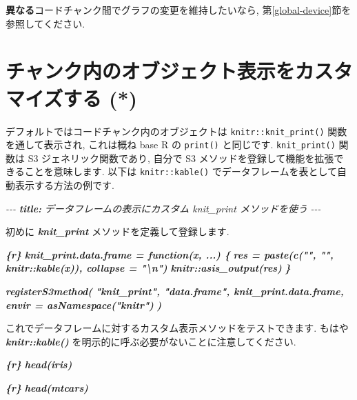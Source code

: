 \documentclass[
  11pt,
  lualatex,
  ja=standard]{bxjsreport}
\newenvironment{Shaded}{\begin{snugshade}}{\end{snugshade}}
\newcommand{\AnnotationTok}[1]{\textcolor[rgb]{0.56,0.35,0.01}{\textbf{\textit{#1}}}}
\newcommand{\CommentTok}[1]{\textcolor[rgb]{0.56,0.35,0.01}{\textit{#1}}}
\newcommand{\InformationTok}[1]{\textcolor[rgb]{0.56,0.35,0.01}{\textbf{\textit{#1}}}}
\newcommand{\NormalTok}[1]{#1}
\begin{document}
\textbf{異なる}コードチャンク間でグラフの変更を維持したいなら, 第\ref{global-device}節を参照してください.

\hypertarget{opts-render}{%
\section{チャンク内のオブジェクト表示をカスタマイズする (*)}\label{opts-render}}

デフォルトではコードチャンク内のオブジェクトは \texttt{knitr::knit\_print()} 関数を通して表示され, これは概ね base R の \texttt{print()} と同じです. \texttt{knit\_print()} 関数は S3 ジェネリック関数であり, 自分で S3 メソッドを登録して機能を拡張できることを意味します. 以下は \texttt{knitr::kable()} でデータフレームを表として自動表示する方法の例です.

\begin{Shaded}
\begin{Highlighting}[]
\CommentTok{{-}{-}{-}}
\AnnotationTok{title:}\CommentTok{ データフレームの表示にカスタム \textasciigrave{}knit\_print\textasciigrave{} メソッドを使う}
\CommentTok{{-}{-}{-}}

\NormalTok{初めに }\InformationTok{\textasciigrave{}knit\_print\textasciigrave{}}\NormalTok{ メソッドを定義して登録します.}

\InformationTok{\textasciigrave{}\textasciigrave{}\textasciigrave{}\{r\}}
\InformationTok{knit\_print.data.frame = function(x, ...) \{}
\InformationTok{  res = paste(c("", "", knitr::kable(x)), collapse = "\textbackslash{}n")}
\InformationTok{  knitr::asis\_output(res)}
\InformationTok{\}}

\InformationTok{registerS3method(}
\InformationTok{  "knit\_print", "data.frame", knit\_print.data.frame,}
\InformationTok{  envir = asNamespace("knitr")}
\InformationTok{)}
\InformationTok{\textasciigrave{}\textasciigrave{}\textasciigrave{}}

\NormalTok{これでデータフレームに対するカスタム表示メソッドをテストできます. もはや }\InformationTok{\textasciigrave{}knitr::kable()\textasciigrave{}}\NormalTok{ を明示的に呼ぶ必要がないことに注意してください.}

\InformationTok{\textasciigrave{}\textasciigrave{}\textasciigrave{}\{r\}}
\InformationTok{head(iris)}
\InformationTok{\textasciigrave{}\textasciigrave{}\textasciigrave{}}

\InformationTok{\textasciigrave{}\textasciigrave{}\textasciigrave{}\{r\}}
\InformationTok{head(mtcars)}
\InformationTok{\textasciigrave{}\textasciigrave{}\textasciigrave{}}
\end{Highlighting}
\end{Shaded}
\end{document}
